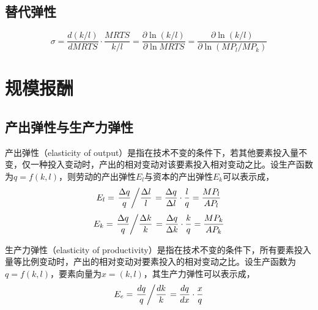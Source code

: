 \subsection{替代弹性}
\label{subsec:elasticity-of-substitution}
\begin{equation}
\sigma  = \frac{{d(k/l)}}{{dMRTS}}\cdot\frac{{MRTS}}{{k/l}} = \frac{{\partial \ln (k/l)}}{{\partial \ln MRTS}} = \frac{{\partial \ln (k/l)}}{{\partial \ln ({MP_l}/{MP_k})}}
\label{eq:elasticity-of-substitution}
\end{equation}

\section{规模报酬}

\subsection{产出弹性与生产力弹性}

%
产出弹性（elasticity of output）是指在技术不变的条件下，若其他要素投入量不变，仅一种投入变动时，产出的相对变动对该要素投入相对变动之比。设生产函数为$q=f(k,l)$，则劳动的产出弹性$E_l$与资本的产出弹性$E_k$可以表示成，
\begin{equation}
E_l = \left. {\frac{{\Delta q}}{q}} \middle/ {\frac{{\Delta l}}{l}} \right. = \frac{\Delta q}{\Delta l} \cdot \frac{l}{q} = \frac{MP_l}{AP_l}
\label{eq:chanchu-tanxing-labour}
\end{equation}
\begin{equation}
E_k = \left. {\frac{{\Delta q}}{q}} \middle/ {\frac{{\Delta k}}{k}} \right. = \frac{\Delta q}{\Delta k} \cdot \frac{k}{q} = \frac{MP_k}{AP_k}
\label{eq:chanchu-tanxing-capital}
\end{equation}

%
生产力弹性（elasticity of productivity）是指在技术不变的条件下，所有要素投入量等比例变动时，产出的相对变动对要素投入的相对变动之比。设生产函数为$q=f(k,l)$，要素向量为$x=(k,l)$，其生产力弹性可以表示成，
\begin{equation}
E_e = \left. {\frac{{dq}}{q}} \middle/ {\frac{{dk}}{k}} \right. = \frac{dq}{dx} \cdot \frac{x}{q}
\label{eq:shengchanli-tanxing}
\end{equation}


